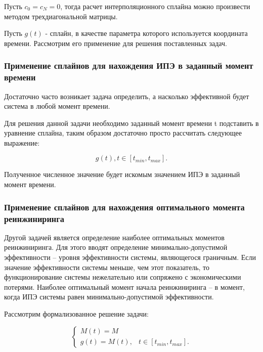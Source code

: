 Пусть $c_{0} = c_{N} = 0$, тогда расчет интерполяционного сплайна можно произвести методом трехдиагональной матрицы.

Пусть $g(t)$ - сплайн, в качестве параметра которого используется координата времени. Рассмотрим его применение для решения поставленных задач.

\subsubsection{Применение сплайнов для нахождения ИПЭ в заданный момент времени}
Достаточно часто возникает задача определить, а насколько эффективной будет система в любой момент времени. 

Для решения данной задачи необходимо заданный момент времени t подставить в уравнение сплайна, таким образом достаточно просто рассчитать следующее выражение:

\begin{equation}
    g(t), t \in [t_{min},t_{max}].
\end{equation}
\vspace{\belowdisplayshortskip}

Полученное численное значение будет искомым значением ИПЭ в заданный момент времени.

\subsubsection{Применение сплайнов для нахождения оптимального момента реинжиниринга}

Другой задачей является определение наиболее оптимальных моментов реинжиниринга.
Для этого вводят определение минимально-допустимой эффективности – уровня эффективности системы, являющегося граничным. 
Если значение эффективности системы меньше, чем этот показатель, то функционирование системы нежелательно или сопряжено с экономическими потерями. 
Наиболее оптимальный момент начала реинжиниринга – в момент, когда ИПЭ системы равен минимально-допустимой эффективности.

Рассмотрим формализованное решение задачи:

\begin{equation}
    \begin{cases}
        M(t)=M  \\
        g(t)=M(t), & t \in [t_{min},t_{max}].
    \end{cases}
\end{equation}
\vspace{\belowdisplayshortskip}

